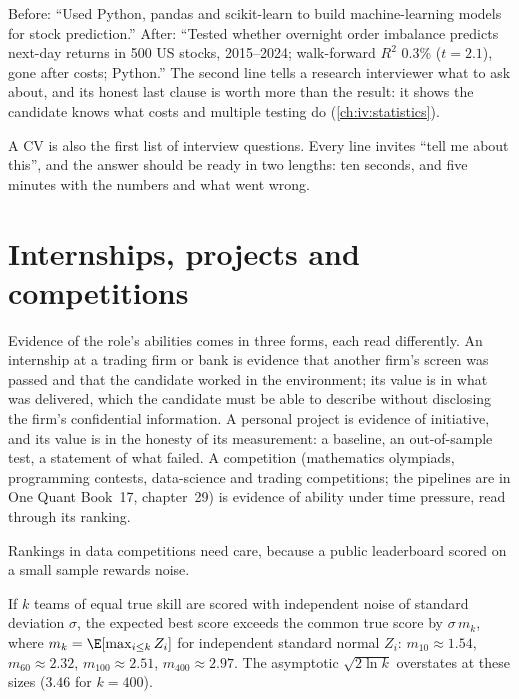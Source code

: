 \begin{example}\label{ex:iv:applications:line}
Before: ``Used Python, pandas and scikit-learn to build machine-learning models for stock prediction.''
After: ``Tested whether overnight order imbalance predicts next-day returns in 500 US stocks, 2015--2024;
walk-forward $R^2$ 0.3\% ($t = 2.1$), gone after costs; Python.'' The second line tells a research
interviewer what to ask about, and its honest last clause is worth more than the result: it shows the
candidate knows what costs and multiple testing do (\cref{ch:iv:statistics}).
\end{example}

A CV is also the first list of interview questions. Every line invites ``tell me about this'', and the
answer should be ready in two lengths: ten seconds, and five minutes with the numbers and what went wrong.

\section{Internships, projects and competitions}

Evidence of the role's abilities comes in three forms, each read differently. An internship at a trading firm
or bank is evidence that another firm's screen was passed and that the candidate worked in the environment;
its value is in what was delivered, which the candidate must be able to describe without disclosing the
firm's confidential information. A personal project is evidence of initiative, and its value is in the
honesty of its measurement: a baseline, an out-of-sample test, a statement of what failed. A competition
(mathematics olympiads, programming contests, data-science and trading competitions; the pipelines are in
One Quant Book~17, chapter~29) is evidence of ability under time pressure, read through its ranking.

Rankings in data competitions need care, because a public leaderboard scored on a small sample rewards noise.

\begin{proposition}\label{prop:iv:applications:max}
If $k$ teams of equal true skill are scored with independent noise of standard deviation $\sigma$, the
expected best score exceeds the common true score by $\sigma\,m_k$, where $m_k = \E[\max_{i\le k} Z_i]$ for
independent standard normal $Z_i$: $m_{10} \approx 1.54$, $m_{60} \approx 2.32$, $m_{100} \approx 2.51$,
$m_{400} \approx 2.97$. The asymptotic $\sqrt{2\ln k}$ overstates at these sizes ($3.46$ for $k = 400$).
\end{proposition}

